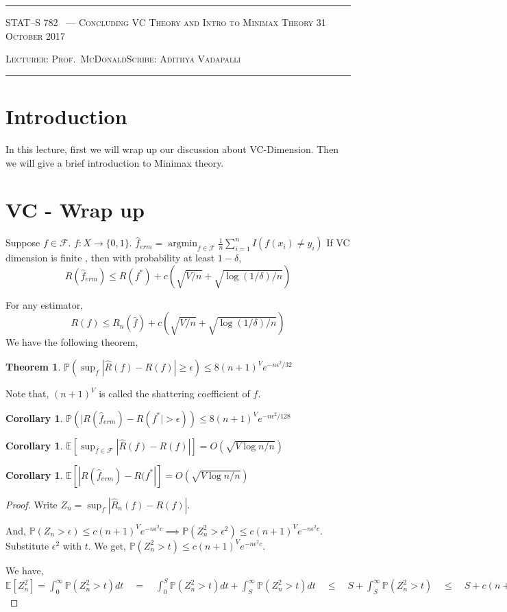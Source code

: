 \documentclass[10pt]{article}
\newcounter{lecnum}
\newtheorem{theorem}{Theorem}[lecnum]
\newtheorem{corollary}[cor]{Corollary}
\renewcommand{\P}{\mathbb{P}}
\DeclareMathOperator*{\argmin}{argmin}
\renewcommand{\hat}{\widehat}
\newcommand{\lecturer}{Prof.\ McDonald}
\newcommand{\scribe}{Adithya Vadapalli}
\newcommand{\chtitle}{Concluding VC Theory and Intro to Minimax Theory}
\newcommand{\lecdate}{31 October 2017}
\begin{document}
	\rule{6.5in}{1pt}
	
	\textsc{STAT--S 782
		\hfill \thelecnum\ --- \chtitle
		\hfill \lecdate}
	
	\textsc{Lecturer: \lecturer \hfill Scribe: \scribe}
	\rule{6.5in}{1pt}
	
	
	\section*{Introduction}
	In this lecture, first we will wrap up our discussion about VC-Dimension. Then we will give a brief introduction to Minimax theory.
	
	\section{VC - Wrap up}

	Suppose $f \in \mathcal{F}$. $f : X \to \{0, 1\}$. $\hat{f}_{erm} = \argmin_{f \in \mathcal{F}} \frac{1}{n} \sum_{i=1}^{n}I(f(x_i) \neq y_i)$
	If VC dimension is finite , then with probability at least $1 - \delta$,
	\[
	 R(\hat{f}_{erm}) \le R(f^{*}) + c(\sqrt{V/n} + \sqrt{\log (1/\delta)/n})
	\]	
	
	For any estimator,
	\[
	R(f) \le R_{n}(\hat{f}) + c(\sqrt{V/n} + \sqrt{\log (1/\delta)/n})
	\]
	We have the following theorem,
	\begin{theorem}
		$\P(\sup_{f} |\hat{R}(f) - R(f)| \ge \epsilon) \le 8 (n + 1)^V e^{-n \epsilon^2/32}$
	\end{theorem}
	
	Note that, $(n + 1)^V$ is called the shattering coefficient of $f$.
	
	\begin{corollary}
		$\P(|R(\hat{f}_{erm}) - R(f^{*}| > \epsilon)) \le 8 (n + 1)^V e^{-n\epsilon^2/128}$
	\end{corollary}


	\begin{corollary}
	$\mathbb{E}[\sup_{f \in \mathcal{F}}|\hat{R}(f) - R(f)|] = O(\sqrt{V \log n / n})$
	\end{corollary}

	\begin{corollary}
	$\mathbb{E}[|R(\hat{f}_{erm}) - R(f^{*}|] = O(\sqrt{V \log n / n})$
	\end{corollary}

	\begin{proof}
		Write $Z_{n} = \sup_{f} |\hat{R}_{n}(f) - R(f)|$.
		
		And, $\P(Z_n > \epsilon ) \le c(n + 1)^{V} e^{-n\epsilon^2 c} \implies\P(Z_n^2 > \epsilon^2 ) \le c(n + 1)^{V} e^{-n\epsilon^2 c}$. Substitute $\epsilon^2$ with $t$. We get, $\P(Z_n^2 > t ) \le c(n + 1)^{V} e^{-n\epsilon^2 c}$.
		
		We have, $\mathbb{E}[Z_n^2] = \int_{0}^{\infty} \P(Z_n^2 > t) dt \quad = \quad \int_{0}^{S} \P(Z_n^2 > t) dt +  \int_{S}^{\infty} \P(Z_n^2 > t) dt \quad \le \quad S +  \int_{S}^{\infty} \P(Z_n^2 > t) \quad \le \quad S + c(n + 1)^V \int_{S}^{\infty} \P(Z^2 > t) dt \quad = \quad S + c(n + 1)^V(\frac{e^{-cnS}}{cn}) \quad  = \quad V \log(n + 1)/cn + c/n$
	\end{proof}
\end{document}
